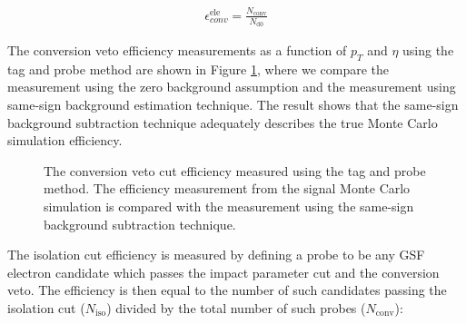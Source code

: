 \documentclass{cmspaper}
\begin{document}
\begin{eqnarray}
  \label{eqn:conversionVetoEfficiency}  
  \epsilon_{conv}^{\mathrm{ele}} = \frac{N_{\mathrm{conv}}}{N_{\mathrm{d0}}}
\end{eqnarray}

The conversion veto efficiency measurements as a function of $p_{T}$ and $\eta$ using the tag and probe method are shown in Figure \ref{convVetoEfficiency_TagAndProbe}, where we compare the measurement using the zero background assumption and the measurement using same-sign background estimation technique. The result shows that the same-sign background subtraction technique adequately describes the true Monte Carlo simulation efficiency.

\begin{figure}[htb]
  \begin{center}
    \caption{The conversion veto cut efficiency measured using the tag and probe method. The efficiency measurement from the signal Monte Carlo simulation is compared with the measurement using the same-sign background subtraction technique.}
    \label{convVetoEfficiency_TagAndProbe}
  \end{center}
\end{figure}


The isolation cut efficiency is measured by defining a probe to be any GSF electron candidate which passes the impact parameter cut and the conversion veto. The efficiency is then equal to the number of such candidates passing the isolation cut ($N_{\mathrm{iso}}$) divided by the total number of such probes ($N_{\mathrm{conv}}$):
\end{document}

